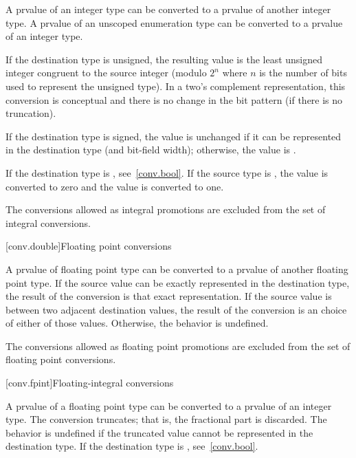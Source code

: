 \pnum
{}%
A prvalue of an integer type can be converted to a prvalue of another
integer type. A prvalue of an unscoped enumeration type can be converted to
a prvalue of an integer type.

\pnum
{}%
If the destination type is unsigned, the resulting value is the least
unsigned integer congruent to the source integer (modulo $2^n$ where $n$
is the number of bits used to represent the unsigned type).
\enternote 
In a two's complement representation, this conversion is conceptual and
there is no change in the bit pattern (if there is no truncation).
\exitnote 

\pnum
{}%
If the destination type is signed, the value is unchanged if it can be
represented in the destination type (and bit-field width); otherwise,
the value is .

\pnum
{}%
If the destination type is , see~\ref{conv.bool}. If the
source type is , the value  is converted to
zero and the value  is converted to one.

\pnum
The conversions allowed as integral promotions are excluded from the set
of integral conversions.

[conv.double]{Floating point conversions}

\pnum
{}%
A prvalue of floating point type can be converted to a prvalue of
another floating point type. If the source value can be exactly
represented in the destination type, the result of the conversion is
that exact representation. If the source value is between two adjacent
destination values, the result of the conversion is an
 choice of either of those values.
Otherwise, the behavior is undefined.

\pnum
The conversions allowed as floating point promotions are excluded from
the set of floating point conversions.

[conv.fpint]{Floating-integral conversions}

\pnum
{}%
A prvalue of a floating point type can be converted to a prvalue of an
integer type. The conversion truncates; that is, the fractional part is
discarded.
%
The behavior is undefined if the truncated value cannot be represented
in the destination type.
\enternote 
If the destination type is , see~\ref{conv.bool}.
\exitnote 

